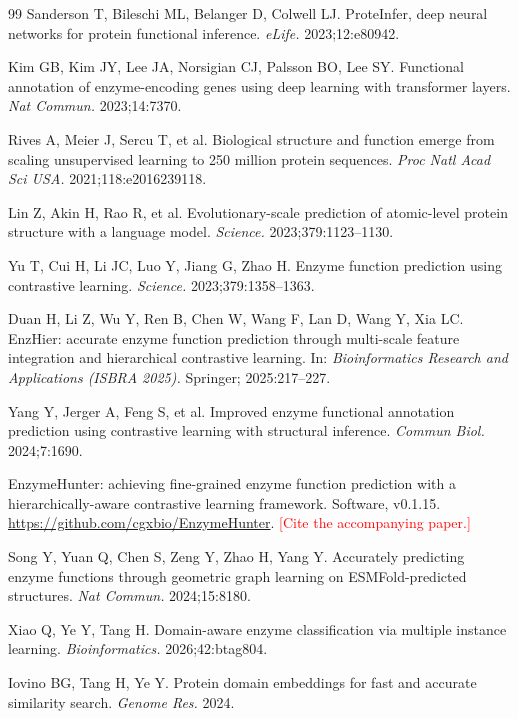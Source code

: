 \documentclass[11pt]{article}
\newcommand{\todo}[1]{\textcolor{red}{[#1]}}
\begin{document}
\begin{thebibliography}{99}
Sanderson T, Bileschi ML, Belanger D, Colwell LJ. ProteInfer, deep neural networks for protein functional inference.
\emph{eLife.} 2023;12:e80942.

Kim GB, Kim JY, Lee JA, Norsigian CJ, Palsson BO, Lee SY. Functional annotation of enzyme-encoding genes using deep
learning with transformer layers. \emph{Nat Commun.} 2023;14:7370.

Rives A, Meier J, Sercu T, et al. Biological structure and function emerge from scaling unsupervised learning to 250
million protein sequences. \emph{Proc Natl Acad Sci USA.} 2021;118:e2016239118.

Lin Z, Akin H, Rao R, et al. Evolutionary-scale prediction of atomic-level protein structure with a language model.
\emph{Science.} 2023;379:1123--1130.

Yu T, Cui H, Li JC, Luo Y, Jiang G, Zhao H. Enzyme function prediction using contrastive learning. \emph{Science.}
2023;379:1358--1363.

Duan H, Li Z, Wu Y, Ren B, Chen W, Wang F, Lan D, Wang Y, Xia LC. EnzHier: accurate enzyme function prediction through
multi-scale feature integration and hierarchical contrastive learning. In: \emph{Bioinformatics Research and
Applications (ISBRA 2025).} Springer; 2025:217--227.

Yang Y, Jerger A, Feng S, et al. Improved enzyme functional annotation prediction using contrastive learning with
structural inference. \emph{Commun Biol.} 2024;7:1690.

EnzymeHunter: achieving fine-grained enzyme function prediction with a hierarchically-aware contrastive learning
framework. Software, v0.1.15. \url{https://github.com/cgxbio/EnzymeHunter}. \todo{Cite the accompanying paper.}

Song Y, Yuan Q, Chen S, Zeng Y, Zhao H, Yang Y. Accurately predicting enzyme functions through geometric graph
learning on ESMFold-predicted structures. \emph{Nat Commun.} 2024;15:8180.

Xiao Q, Ye Y, Tang H. Domain-aware enzyme classification via multiple instance learning. \emph{Bioinformatics.}
2026;42:btag804.

Iovino BG, Tang H, Ye Y. Protein domain embeddings for fast and accurate similarity search. \emph{Genome Res.} 2024.


\end{thebibliography}
\end{document}
